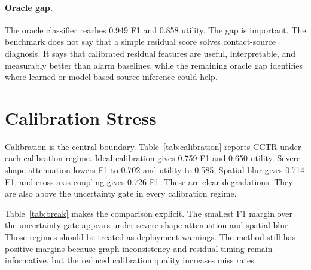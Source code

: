 \documentclass{article}
\newcommand{\method}{CCTR}
\begin{document}
\paragraph{Oracle gap.}
The oracle classifier reaches 0.949 F1 and 0.858 utility. The gap is important. The benchmark does not say that a simple residual score solves contact-source diagnosis. It says that calibrated residual features are useful, interpretable, and measurably better than alarm baselines, while the remaining oracle gap identifies where learned or model-based source inference could help.

\section{Calibration Stress}

\begin{table}[t]
\centering
\small
\resizebox{\linewidth}{!}{}
\caption{Performance of \method{} under calibration stress. Severe shape attenuation, spatial blur, and cross-axis coupling reduce performance but do not erase the margin over the uncertainty gate in this suite.}
\label{tab:calibration}
\end{table}

Calibration is the central boundary. Table~\ref{tab:calibration} reports \method{} under each calibration regime. Ideal calibration gives 0.759 F1 and 0.650 utility. Severe shape attenuation lowers F1 to 0.702 and utility to 0.585. Spatial blur gives 0.714 F1, and cross-axis coupling gives 0.726 F1. These are clear degradations. They are also above the uncertainty gate in every calibration regime.

\begin{table}[t]
\centering
\small
\resizebox{0.92\linewidth}{!}{}
\caption{Break-even test against the uncertainty gate. Positive margins mean \method{} keeps both F1 and utility advantages under that calibration regime.}
\label{tab:break}
\end{table}

Table~\ref{tab:break} makes the comparison explicit. The smallest F1 margin over the uncertainty gate appears under severe shape attenuation and spatial blur. Those regimes should be treated as deployment warnings. The method still has positive margins because graph inconsistency and residual timing remain informative, but the reduced calibration quality increases miss rates.
\end{document}
